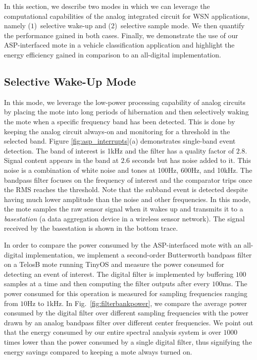 



In this section, we describe two modes in which we can leverage the computational capabilities of the analog integrated circuit for WSN applications, namely ($1$)~selective wake-up and ($2$)~selective sample mode.  We then quantify the performance gained in both cases. Finally, we demonstrate the use of our ASP-interfaced mote in a vehicle classification application and highlight the energy efficiency gained in comparison to an all-digital implementation.




\subsection{Selective Wake-Up Mode}
In this mode, we leverage the low-power processing capability of analog circuits by placing the mote into long periods of hibernation and then selectively waking the mote when a specific frequency band has been detected. This is done by keeping the analog circuit always-on and monitoring for a threshold in the selected band. Figure \ref{fig:asp_interrupts}(a) demonstrates single-band event detection.  The band of interest is 1kHz and the filter has a quality factor of $2.8$.  Signal content appears in the band at $2.6$ seconds but has noise added to it.  This noise is a combination of white noise and tones at 100Hz, 600Hz, and 10kHz. The bandpass filter focuses on the frequency of interest and the comparator trips once the RMS reaches the threshold.   Note that the subband event is detected despite having much lower amplitude than the noise and other frequencies.  In this mode, the mote samples the raw sensor signal when it wakes up and transmits it to a {\em basestation} (a data aggregation device in a wireless sensor network).  The signal received by the basestation is shown in the bottom trace. 



In order to compare the power consumed by the ASP-interfaced mote with an all-digital implementation, we implement a second-order Butterworth bandpass filter on a TelosB mote running TinyOS and measure the power consumed for detecting an event of interest. The digital filter is implemented by buffering $100$ samples at a time and then computing the filter outputs after every $100$ms.  The power consumed for this operation is measured for sampling frequencies ranging from $10$Hz to $1$kHz. In Fig.~\ref{fig:filterbankpower}, we compare the average power consumed by the digital filter over different sampling frequencies with the power drawn by an analog bandpass filter over different center frequencies. We point out that the energy consumed by our entire spectral analysis system is over $1000$ times lower than the power consumed by a single digital filter, thus signifying the energy savings compared to keeping a mote always turned on. 





